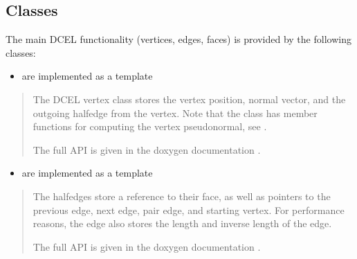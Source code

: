 \documentclass[letterpaper,10pt,english]{sphinxmanual}
\begin{document}
\subsection{Classes}
\label{\detokenize{ImplemDCEL:classes}}
\sphinxAtStartPar
The main DCEL functionality (vertices, edges, faces) is provided by the following classes:
\begin{itemize}
\item {} 
\sphinxAtStartPar
{} are implemented as a template 

\end{itemize}
\begin{quote}

\begin{sphinxVerbatim}[commandchars=\\\{\}]
\end{sphinxVerbatim}

\sphinxAtStartPar
The DCEL vertex class stores the vertex position, normal vector, and the outgoing half\sphinxhyphen{}edge from the vertex.
Note that the class has member functions for computing the vertex pseudonormal, see {\hyperref[\detokenize{DCEL:chap-normaldcel}]{}}.

\sphinxAtStartPar
The full API is given in the doxygen documentation .
\end{quote}
\begin{itemize}
\item {} 
\sphinxAtStartPar
{} are implemented as a template 

\end{itemize}
\begin{quote}

\begin{sphinxVerbatim}[commandchars=\\\{\}]
\end{sphinxVerbatim}

\sphinxAtStartPar
The half\sphinxhyphen{}edges store a reference to their face, as well as pointers to the previous edge, next edge, pair edge, and starting vertex.
For performance reasons, the edge also stores the length and inverse length of the edge.

\sphinxAtStartPar
The full API is given in the doxygen documentation .
\end{quote}
\end{document}
